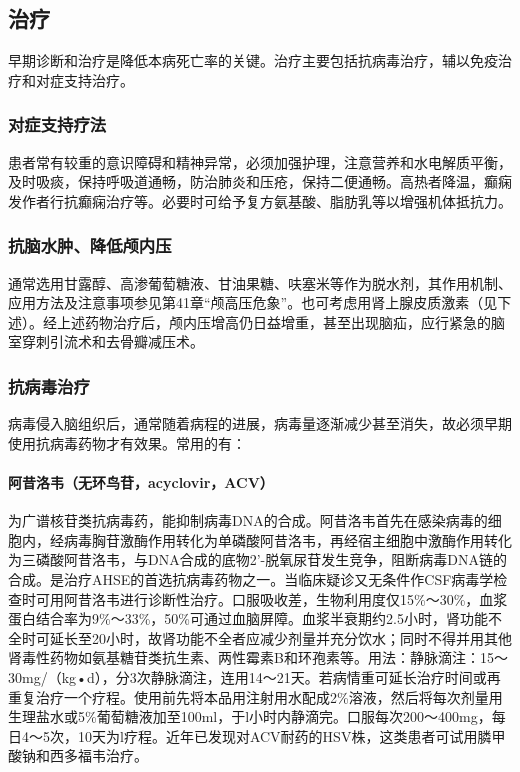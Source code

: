 \subsection{治疗}

早期诊断和治疗是降低本病死亡率的关键。治疗主要包括抗病毒治疗，辅以免疫治疗和对症支持治疗。

\subsubsection{对症支持疗法}

患者常有较重的意识障碍和精神异常，必须加强护理，注意营养和水电解质平衡，及时吸痰，保持呼吸道通畅，防治肺炎和压疮，保持二便通畅。高热者降温，癫痫发作者行抗癫痫治疗等。必要时可给予复方氨基酸、脂肪乳等以增强机体抵抗力。

\subsubsection{抗脑水肿、降低颅内压}

通常选用甘露醇、高渗葡萄糖液、甘油果糖、呋塞米等作为脱水剂，其作用机制、应用方法及注意事项参见第41章“颅高压危象”。也可考虑用肾上腺皮质激素（见下述）。经上述药物治疗后，颅内压增高仍日益增重，甚至出现脑疝，应行紧急的脑室穿刺引流术和去骨瓣减压术。

\subsubsection{抗病毒治疗}

病毒侵入脑组织后，通常随着病程的进展，病毒量逐渐减少甚至消失，故必须早期使用抗病毒药物才有效果。常用的有：

\paragraph{阿昔洛韦（无环鸟苷，acyclovir，ACV）}

为广谱核苷类抗病毒药，能抑制病毒DNA的合成。阿昔洛韦首先在感染病毒的细胞内，经病毒胸苷激酶作用转化为单磷酸阿昔洛韦，再经宿主细胞中激酶作用转化为三磷酸阿昔洛韦，与DNA合成的底物2'{-}脱氧尿苷发生竞争，阻断病毒DNA链的合成。是治疗AHSE的首选抗病毒药物之一。当临床疑诊又无条件作CSF病毒学检查时可用阿昔洛韦进行诊断性治疗。口服吸收差，生物利用度仅15\%～30\%，血浆蛋白结合率为9\%～33\%，50\%可通过血脑屏障。血浆半衰期约2.5小时，肾功能不全时可延长至20小时，故肾功能不全者应减少剂量并充分饮水；同时不得并用其他肾毒性药物如氨基糖苷类抗生素、两性霉素B和环孢素等。用法：静脉滴注：15～30mg/（kg•d），分3次静脉滴注，连用14～21天。若病情重可延长治疗时间或再重复治疗一个疗程。使用前先将本品用注射用水配成2\%溶液，然后将每次剂量用生理盐水或5\%葡萄糖液加至100ml，于l小时内静滴完。口服每次200～400mg，每日4～5次，10天为l疗程。近年已发现对ACV耐药的HSV株，这类患者可试用膦甲酸钠和西多福韦治疗。

